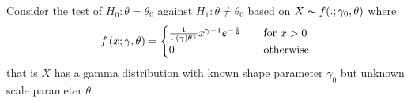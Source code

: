 \documentclass[12pt, a4paper]{article}\usepackage[]{graphicx}\usepackage[]{color}
\begin{document}


\pagestyle{default}
\thispagestyle{empty}

\newpage
\setcounter{page}{1}

Consider the test of $H_0: \theta = \theta_0$ against $H_1 : \theta \neq \theta_0$ based on $X\thicksim f(. ; \gamma_0, \theta)$ where
\begin{align}
f\left(x; \gamma, \theta\right) = 
\begin{cases}
\frac{1}{\Gamma\left(\gamma\right)\theta^\gamma}x^{\gamma - 1}e^{-\frac{x}{\theta}} &\quad\text{for } x > 0 \\
0 &\quad\text{otherwise}
\end{cases}
\end{align}
that is $X$ has a gamma distribution with known shape parameter $\gamma_0$ but unknown scale parameter $\theta$.
\end{document}
